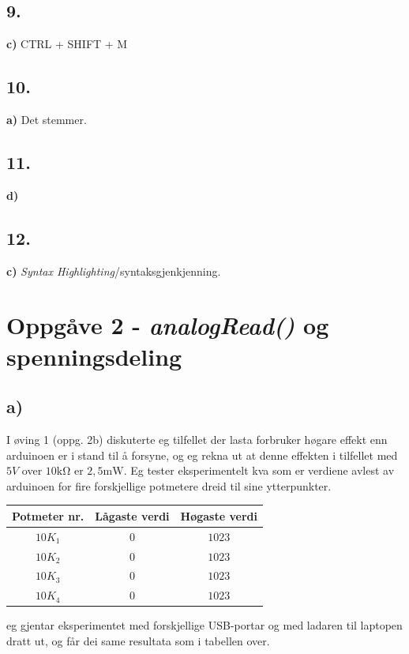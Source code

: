 \documentclass[12pt,a4paper]{article}
\begin{document}
    \subsection*{9.}
    \textbf{c)} CTRL + SHIFT + M

    \subsection*{10.}
    \textbf{a)} Det stemmer.

    \subsection*{11.}
    \textbf{d)}

    \subsection*{12.}
    \textbf{c)} \textit{Syntax Highlighting}/syntaksgjenkjenning.

  \section*{Oppgåve 2 - \textit{analogRead()} og spenningsdeling}
    \subsection*{a)}
    I øving 1 (oppg. 2b) diskuterte eg tilfellet der lasta forbruker høgare effekt enn
    arduinoen er i stand til å forsyne, og eg rekna ut at denne effekten i tilfellet med
    $5V$ over $10\si{\kilo\ohm}$ er $2,5\si{\milli\watt}$. Eg tester eksperimentelt kva som
    er verdiene avlest av arduinoen for fire forskjellige potmetere dreid til sine ytterpunkter.
    \begin{center}
      \begin{tabular}{ |c|c|c| }
        \hline
        Potmeter nr. & Lågaste verdi & Høgaste verdi \\
        \hline
        $10K_1$ & $0$ & $1023$ \\
        \hline
        $10K_2$ & $0$ & $1023$ \\
        \hline
        $10K_3$ & $0$ & $1023$ \\
        \hline
        $10K_4$ & $0$ & $1023$ \\
        \hline
      \end{tabular}
    \end{center}
    eg gjentar eksperimentet med forskjellige USB-portar og med ladaren til laptopen dratt ut,
    og får dei same resultata som i tabellen over.
    \bigskip
\end{document}
